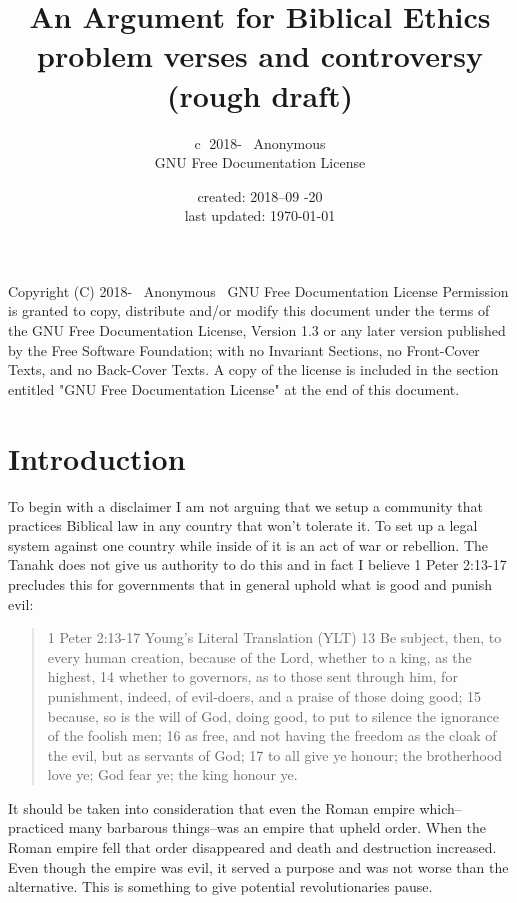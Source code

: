 \documentclass[11pt]{article}
\title{\textbf{An Argument for Biblical Ethics} \large \\ problem verses and controversy (rough draft) }
\author{\textcircled{c} 2018-\the\year
 \ Anonymous \\ GNU Free Documentation License  }
\date{created: 2018--09 -20 \\ last updated: \today{}}
\begin{document}
\maketitle
\tableofcontents 

\noindent \newline Copyright (C) 2018-\the\year
 \ Anonymous \ GNU Free Documentation License \newline
Permission is granted to copy, distribute and/or modify this document\newline
under the terms of the GNU Free Documentation License, Version 1.3\newline
or any later version published by the Free Software Foundation;\newline
with no Invariant Sections, no Front-Cover Texts, and no Back-Cover Texts.\newline
A copy of the license is included in the section entitled "GNU\newline
Free Documentation License" at the end of this document.

\section{Introduction}
To begin with a disclaimer I am not arguing that we setup a community that practices Biblical law in any country that won't tolerate it. To set up a legal system against one country while inside of it is an act of war or rebellion. The Tanahk does not give us authority to do this and in fact I believe 1 Peter 2:13-17 precludes this for governments that in general uphold what is good and punish evil: 

\begin{quote}
1 Peter 2:13-17 Young's Literal Translation (YLT)
13 Be subject, then, to every human creation, because of the Lord, whether to a king, as the highest,
14 whether to governors, as to those sent through him, for punishment, indeed, of evil-doers, and a praise of those doing good;
15 because, so is the will of God, doing good, to put to silence the ignorance of the foolish men;
16 as free, and not having the freedom as the cloak of the evil, but as servants of God;
17 to all give ye honour; the brotherhood love ye; God fear ye; the king honour ye.
\end{quote}

It should be taken into consideration that even the Roman empire which--practiced many barbarous things--was an empire that upheld order. When the Roman empire fell that order disappeared and death and destruction increased. Even though the empire was evil, it served a purpose and was not worse than the alternative. This is something to give potential revolutionaries pause.
\end{document}
